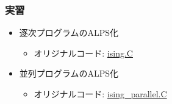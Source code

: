 \begin{frame}[fragile]
  \frametitle{実習}
  \begin{itemize}
    \setlength{\itemsep}{1em}
  \item 逐次プログラムのALPS化
    \begin{itemize}
      \item オリジナルコード: \href{https://github.com/cmsi/alps-tutorial/blob/develop/alpsize/ising.C}{ising.C}
    \end{itemize}
  \item 並列プログラムのALPS化
    \begin{itemize}
      \item オリジナルコード: \href{https://github.com/cmsi/alps-tutorial/blob/develop/alpsize/ising_parallel.C}{ising\_parallel.C}
    \end{itemize}
  \end{itemize}
\end{frame}


